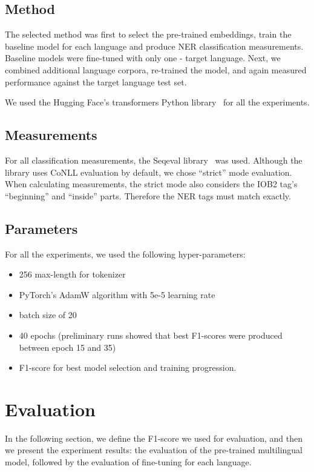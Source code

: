 \documentclass[sigconf]{acmart}
\newcommand{\mpu}[1]{\hl{\textbf{MP:} #1}}
\begin{document}
\subsection{Method}
\label{subsec:method}
The selected method was first to select the pre-trained embeddings, train the baseline model for each language and produce NER classification measurements.
Baseline models were fine-tuned with only one - target language.
Next, we combined additional language corpora, re-trained the model, and again measured performance against the target language test set.

We used the Hugging Face's transformers Python library~\cite{wolf-etal-2020-transformers} for all the experiments.

\subsection{Measurements}
\label{subsec:measurements}
For all classification measurements, the Seqeval library~\cite{seqeval} was used.
Although the library uses CoNLL evaluation by default, we chose ``strict'' mode evaluation.
When calculating measurements, the strict mode also considers the IOB2 tag's ``beginning'' and ``inside'' parts.
Therefore the NER tags must match exactly.

\subsection{Parameters}
\label{subsec:parameters}
For all the experiments, we used the following hyper-parameters:
\begin{itemize}
  \item 256 max-length for tokenizer
  \item PyTorch's AdamW algorithm with 5e-5 learning rate
  \item batch size of 20
  \item 40 epochs (preliminary runs showed that best F1-scores were produced between epoch 15 and 35)
  \item F1-score for best model selection and training progression.
\end{itemize}

\section{Evaluation}
\label{sec:evaluation}
In the following section, we define the F1-score we used for evaluation, and then we present the experiment results: the evaluation of the pre-trained multilingual model, followed by the evaluation of fine-tuning for each language.
\end{document}
